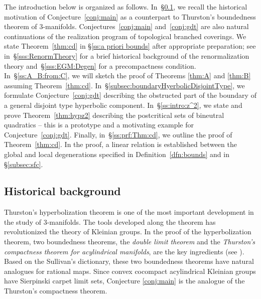 \documentclass[11pt, reqno]{amsart}
\numberwithin{equation}{section}
\theoremstyle{plain}
\theoremstyle{theorem}
\theoremstyle{plain}
\theoremstyle{definition}
\numberwithin{figure}{section}
\begin{document}
The introduction below is organized as follows. In~\S\ref{ss:HistBackgr}, we recall the historical motivation of Conjecture~\ref{conj:main} as a counterpart to Thurston's boundedness theorem of $3$-manifolds. Conjectures~\ref{conj:main} and~\ref{conj:gdt} are also natural continuations of the realization program of topological branched coverings. We state Theorem~\ref{thm:cd} in \S\ref{ss:a priori bounds} after appropriate preparation; see in~\S\ref{sss:RenormTheory} for a brief historical background of the renormalization theory and~\S\ref{sss:EGM:Degen} for a precompactness condition. In~\S\ref{ss:A_B:from:C}, we will sketch the proof of Theorems \ref{thm:A} and \ref{thm:B} assuming Theorem~\ref{thm:cd}. In~\S\ref{subsec:boundaryHyerbolicDisjointType}, we formulate Conjecture~\ref{conj:gdt} describing the obstructed part of the boundary of a general disjoint type hyperbolic component. In~\S\ref{ss:intro:z^2}, we state and prove Theorem~\ref{thm:hypz2} describing the postcritical sets of bineutral quadratics -- this is a prototype and a motivating example for Conjecture~\ref{conj:gdt}. Finally, in~\S\ref{ss:prf:Thm:cd}, we outline the proof of Theorem~\ref{thm:cd}. In the proof, a linear relation is established between the global and local degenerations specified in Definition~\ref{dfn:bounds} and in \S\ref{subsec:sfc}.




\subsection{Historical background}\label{ss:HistBackgr}
Thurston's hyperbolization theorem is one of the most important development in the study of 3-manifolds.
The tools developed along the theorem has revolutionized the theory of Kleinian groups.
In the proof of the hyperbolization theorem,
two boundedness theorems, the {\em double limit theorem} and the {\em Thurston's compactness theorem for acylindrical manifolds}, 
are the key ingredients (see \cite{Kap10, Thu86}).
Based on the Sullivan's dictionary, these two boundedness theorems have natural analogues for rational maps. 
Since convex cocompact acylindrical Kleinian groups have Sierpinski carpet limit sets, Conjecture \ref{conj:main} is the analogue of the Thurston's compactness theorem.
\end{document}
